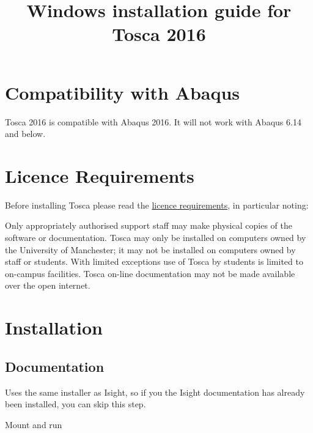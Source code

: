 \documentclass[10pt,a4paper]{article}
\title{Windows installation guide for Tosca 2016}
\date{} %
\begin{document}
	\maketitle
	
	\section*{Compatibility with Abaqus}
	Tosca 2016 is compatible with Abaqus 2016. It will not work with Abaqus 6.14 and below.
	
	\section{Licence Requirements}
	Before installing Tosca please read the \href{https://www.applications.itservices.manchester.ac.uk/show_product.php?id=184&tab=licensing}{licence requirements}, in particular noting:
	
	Only appropriately authorised support staff may make physical copies of the software or documentation.
	Tosca may only be installed on computers owned by the University of Manchester; it may not be installed on computers owned by staff or students.
	With limited exceptions use of Tosca by students is limited to on-campus facilities.
	Tosca on-line documentation may not be made available over the open internet.
	
	\section{Installation}
	\subsection{Documentation}
	Uses the same installer as Isight, so if you the Isight documentation has already been installed, you can skip this step.
	
	Mount  and run 
	
\end{document}
